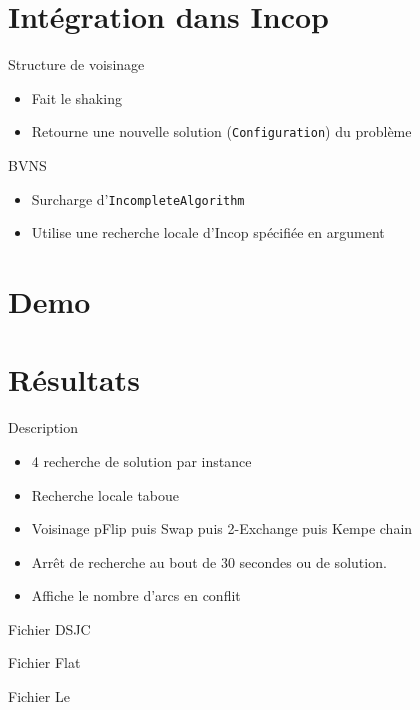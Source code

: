 \documentclass{beamer}
\begin{document}
	\section{Intégration dans Incop}
		\begin{frame}{Structure de voisinage}
			\begin{itemize}
				\item Fait le shaking
				\item Retourne une nouvelle solution (\texttt{Configuration}) du problème
			\end{itemize}
		\end{frame}
		
		\begin{frame}{BVNS}
			\begin{itemize}
				\item Surcharge d'\texttt{IncompleteAlgorithm}
				\item Utilise une recherche locale d'Incop spécifiée en argument
			\end{itemize}
		\end{frame}
		
	\section{Demo}
	
	\section{Résultats}
	
		\begin{frame}{Description}
			\begin{itemize}
				\item 4 recherche de solution par instance
				\item Recherche locale taboue
				\item Voisinage pFlip puis Swap puis 2-Exchange puis Kempe chain
				\item Arrêt de recherche au bout de 30 secondes ou de solution.
				\item Affiche le nombre d'arcs en conflit
			\end{itemize}
		\end{frame}
		
		\begin{frame}{Fichier DSJC}
			
		\end{frame}
		
		\begin{frame}{Fichier Flat}
			
		\end{frame}
		
		\begin{frame}{Fichier Le}
			
		\end{frame}
	
\end{document}
